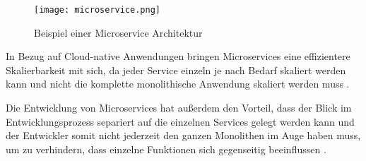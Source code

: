 \begin{figure}[H]
    \centering
    \texttt{[image: microservice.png]}
    \caption{Beispiel einer Microservice Architektur \cite[Nachbildung angelehnt an][S. 150]{Gos2020}}
    \label{fig:microservice}
\end{figure}

In Bezug auf Cloud-native Anwendungen bringen Microservices eine effizientere Skalierbarkeit mit sich, da jeder Service einzeln je nach Bedarf skaliert werden kann und nicht die komplette monolithische Anwendung skaliert werden muss \cite[Vgl.][]{Janssen2021}.

Die Entwicklung von Microservices hat außerdem den Vorteil, dass der Blick im Entwicklungsprozess separiert auf die einzelnen Services gelegt werden kann und der Entwickler somit nicht jederzeit den ganzen Monolithen im Auge haben muss, um zu verhindern, dass einzelne Funktionen sich gegenseitig beeinflussen \cite[Vgl.][]{Janssen2021}. \pagebreak

